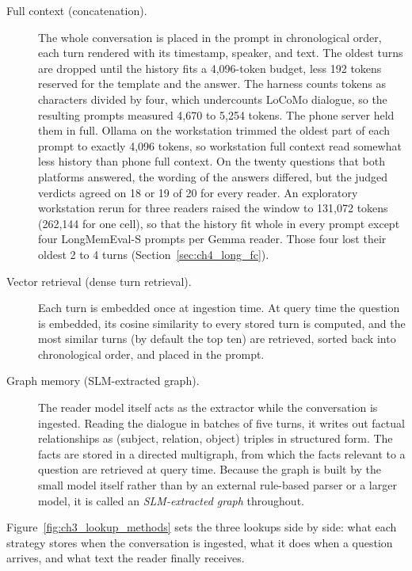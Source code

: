 \begin{description}
  \item[Full context (concatenation).] The whole conversation is placed in the prompt in
        chronological order, each turn rendered with its timestamp, speaker, and text. The oldest
        turns are dropped until the history fits a 4,096-token budget, less 192 tokens reserved for
        the template and the answer. The harness counts tokens as characters divided by four, which
        undercounts LoCoMo dialogue, so the resulting prompts measured 4,670 to 5,254 tokens. The
        phone server held them in full. Ollama on the workstation trimmed the oldest part of each
        prompt to exactly 4,096 tokens, so workstation full context read somewhat less history than
        phone full context. On the twenty questions that both platforms answered, the wording of the
        answers differed, but the judged verdicts agreed on 18 or 19 of 20 for every reader. An
        exploratory workstation rerun for three readers raised the window to 131,072 tokens
        (262,144 for one cell), so that the history fit whole in every prompt except four
        LongMemEval-S prompts per Gemma reader. Those four lost their oldest 2 to 4 turns
        (Section~\ref{sec:ch4_long_fc}).
  \item[Vector retrieval (dense turn retrieval).] Each turn is embedded once at ingestion time. At
        query time the question is embedded, its cosine similarity to every stored turn is computed,
        and the most similar turns (by default the top ten) are retrieved, sorted back into
        chronological order, and placed in the prompt.
  \item[Graph memory (SLM-extracted graph).] The reader model itself acts as the extractor while the
        conversation is ingested. Reading the dialogue in batches of five turns, it writes out
        factual relationships as (subject, relation, object) triples in structured form. The facts
        are stored in a directed multigraph, from which the facts relevant to a question are
        retrieved at query time. Because the graph is built by the small model itself rather than by
        an external rule-based parser or a larger model, it is called an \emph{SLM-extracted graph}
        throughout.
\end{description}

Figure~\ref{fig:ch3_lookup_methods} sets the three lookups side by side: what each strategy stores
when the conversation is ingested, what it does when a question arrives, and what text the reader
finally receives.

